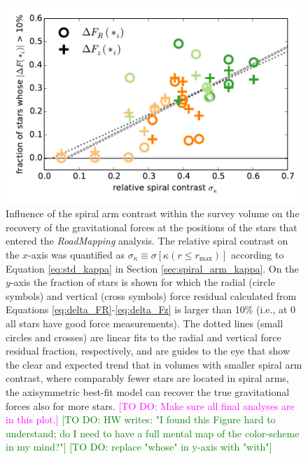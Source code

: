 \documentclass[iop,revtex4,numberedappendix,appendixfloats]{emulateapj}
\newcommand{\RM}{{\sl RoadMapping}}
\newcommand{\Wilma}[1]{\textcolor{Magenta}{#1}}
\newcommand{\HW}[1]{\textcolor{Green}{#1}}
\begin{document}
\begin{figure}[!htbp]
\centering
\includegraphics[width=\columnwidth]{fig/MNdHHdiffSph2_plot_stdkappa_vs_frac10star_2.pdf}
\caption{Influence of the spiral arm contrast within the survey volume on the recovery of the gravitational forces at the positions of the stars that entered the \RM{} analysis. The relative spiral contrast on the $x$-axis was quantified as $\sigma_\kappa \equiv \sigma[\kappa(r\leq r_\text{max})]$ according to Equation \eqref{eq:std_kappa} in Section \ref{sec:spiral_arm_kappa}. On the $y$-axis the fraction of stars is shown for which the radial (circle symbols) and vertical (cross symbols) force residual calculated from Equations \eqref{eq:delta_FR}-\eqref{eq:delta_Fz} is larger than 10\% (i.e., at $0$ all stars have good force measurements). The dotted lines (small circles and crosses) are linear fits to the radial and vertical force residual fraction, respectively, and are guides to the eye that show the clear and expected trend that in volumes with smaller spiral arm contrast, where comparably fewer stars are located in spiral arms, the axisymmetric best-fit model can recover the true gravitational forces also for more stars. \Wilma{[TO DO: Make sure all final analyses are in this plot.]} \HW{[TO DO: HW writes: "I found this Figure hard to understand; do I need to have a full mental map of the color-scheme in my mind?"]} \HW{[TO DO: replace "whose" in y-axis with "with"]}}
\label{fig:std_kappa_vs_frac10_stars}
\end{figure}
\end{document}
